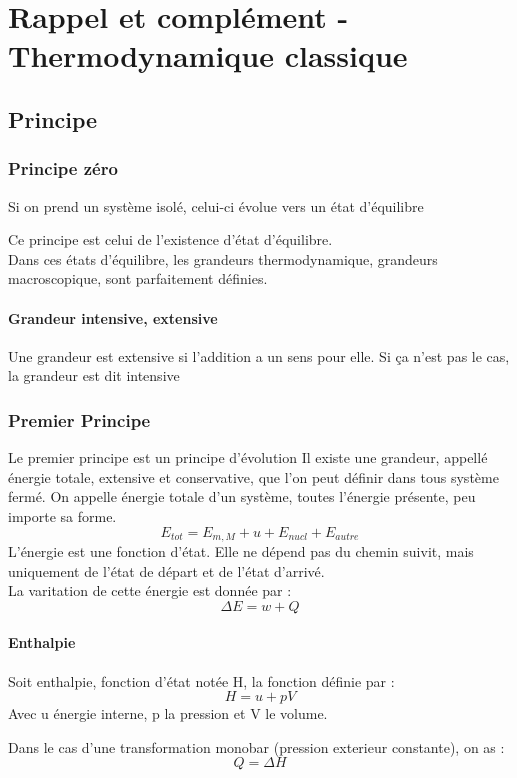 \chapter{Rappel et complément - Thermodynamique classique}
\section{Principe}
\subsection{Principe zéro}
\begin{enon}
Si on prend un système isolé, celui-ci évolue vers un état d'équilibre
\end{enon}
Ce principe est celui de l'existence d'état d'équilibre.\\
Dans ces états d'équilibre, les grandeurs thermodynamique, grandeurs macroscopique, sont parfaitement définies.
\subsubsection{Grandeur intensive, extensive}
\begin{de}
Une grandeur est extensive si l'addition a un sens pour elle. Si ça n'est pas le cas, la grandeur est dit intensive
\end{de}
\subsection{Premier Principe}
\begin{enon}
Le premier principe est un principe d'évolution
Il existe une grandeur, appellé énergie totale, extensive et conservative, que l'on peut définir dans tous système fermé.
On appelle énergie totale d'un système, toutes l'énergie présente, peu importe sa forme.
$$E_{tot}=E_{m,M}+u+E_{nucl}+E_{autre}$$
L'énergie est une fonction d'état. Elle ne dépend pas du chemin suivit, mais uniquement de l'état de départ et de l'état d'arrivé.\\
La varitation de cette énergie est donnée par : 
$$\Delta E = w + Q$$
\end{enon}
\subsubsection{Enthalpie}
\begin{de}
Soit enthalpie, fonction d'état notée H, la fonction définie par : 
$$H = u+pV$$
Avec u énergie interne, p la pression et V le volume. 
\end{de}
\begin{prop}
Dans le cas d'une transformation monobar (pression exterieur constante), on as :
$$Q = \Delta H$$
\end{prop}
